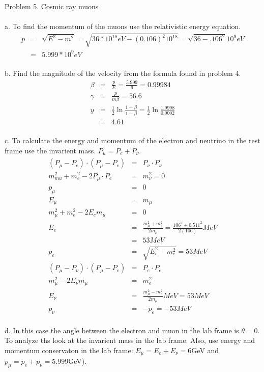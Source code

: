\documentclass[11pt]{amsart}
\begin{document}
Problem 5. Cosmic ray muons \\ \\
a. To find the momentum of the muons use the relativistic energy equation. \\
\begin{eqnarray*}
p &=& \sqrt{E^{2}-m^{2}} = \sqrt{36*10^{18}eV-(0.106)^{2}10^{18}} = \sqrt{36-.106^{2}}10^{9}eV \\
&=& 5.999*10^{9}eV 
\end{eqnarray*} \\
b. Find the magnitude of the velocity from the formula found in problem 4. \\
\begin{eqnarray*}
\beta &=& \frac{p}{E} = \frac{5.999}{6} = 0.99984 \\
\gamma &=& \frac{p}{m\beta} = 56.6 \\
y &=& \frac{1}{2}\ln{\frac{1+\beta}{1-\beta}} = \frac{1}{2}\ln{\frac{1.9998}{0.0002}} \\
&=& 4.61 
\end{eqnarray*} \\
c. To calculate the energy and momentum of the electron and neutrino in the rest frame use the invarient mass. $P_{\mu}=P_{e}+P_{\nu}$. \\
\begin{eqnarray*} 
(P_{\mu}-P_{e})\cdot{(P_{\mu}-P_{e})} &=& P_{\nu}\cdot{P_{\nu}} \\
m_{mu}^{2}+m_{e}^{2}-2P_{\mu}\cdot{P_{e}} &=& m_{\nu}^{2}  = 0 \\
p_{\mu} &=& 0 \\
E_{\mu} &=& m_{\mu} \\
m_{\mu}^{2}+m_{e}^{2}-2E_{e}m_{\mu} &=& 0 \\
E_{e} &=& \frac{m_{\mu}^{2}+m_{e}^{2}}{2m_{\mu}} = \frac{106^{2}+0.511^{2}}{2(106)}MeV \\
&=& 53 MeV \\
p_{e} &=& \sqrt{E_{e}^{2}-m_{e}^{2}} = 53 MeV \\
(P_{\mu}-P_{\nu})\cdot{(P_{\mu}-P_{e})} &=& P_{e}\cdot{P_{e}} \\
m_{\mu}^{2}-2E_{\nu}m_{\mu} &=& m_{e}^{2} \\
E_{\nu} &=& \frac{m_{\mu}^{2}-m_{e}^{2}}{2m_{\mu}}MeV = 53 MeV \\
p_{\nu} &=& -p_{e} = -53 MeV
\end{eqnarray*} \\
d. In this case the angle between the electron and muon in the lab frame is $\theta=0$. To analyze ths look at the invarient mass in the lab frame. Also, use energy and momentum conservaton in the lab frame: $E_{\mu}=E_{e}+E_{\nu}=$6GeV and $p_{\mu}=p_{e}+p_{\nu}=$5.999GeV). \\
\end{document}
